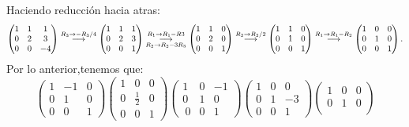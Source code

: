 \documentclass[11pt,letterpaper]{article}
\newcommand{\grstep}[2][\relax]{%
   \ensuremath{\mathrel{
       {\mathop{\longrightarrow}\limits^{#2\mathstrut}_{
                                     \begin{subarray}{l} #1 \end{subarray}}}}}}
\begin{document}
\begin{enumerate}
Haciendo reducción hacia atras:
\begin{equation*}
\begin{pmatrix}
 1 & 1 & 1\\
 0 & 2 & 3\\
 0 & 0 & -4
\end{pmatrix}%
\grstep[]{R_3 \rightarrow -R_3/4}
%
\begin{pmatrix}
 1 & 1 & 1\\
 0 & 2 & 3\\
 0 & 0 & 1
\end{pmatrix}%
\grstep[R_2 \rightarrow R_2-3R_3 ]{R_1 \rightarrow R_1-R3}
%
\begin{pmatrix}
 1 & 1 & 0\\
 0 & 2 & 0\\
 0 & 0 & 1
\end{pmatrix}%
\grstep[]{R_2 \rightarrow R_2/2}
%
\begin{pmatrix}
 1 & 1 & 0\\
 0 & 1 & 0\\
 0 & 0 & 1
\end{pmatrix}%
\grstep[]{R_1 \rightarrow R_1-R_2}
%
\begin{pmatrix}
 1 & 0 & 0\\
 0 & 1 & 0\\
 0 & 0 & 1
\end{pmatrix}.
\end{equation*}
Por lo anterior,tenemos que:
\begin{equation*}
\begin{pmatrix}
 1 &-1 & 0\\
 0 & 1 & 0\\
 0 & 0 & 1
\end{pmatrix}
\begin{pmatrix}
 1 & 0 & 0\\
 0 & \frac{1}{2} & 0\\
 0 & 0 & 1
\end{pmatrix}
\begin{pmatrix}
 1 & 0 & -1\\
 0 & 1 & 0\\\
 0 & 0 & 1
\end{pmatrix}
\begin{pmatrix}
 1 & 0 & 0\\
 0 & 1 & -3\\
 0 & 0 & 1
\end{pmatrix}
\begin{pmatrix}
 1 & 0 & 0\\
 0 & 1 & 0\\

\end{pmatrix}
\end{equation*}
\end{enumerate}
\end{document}
